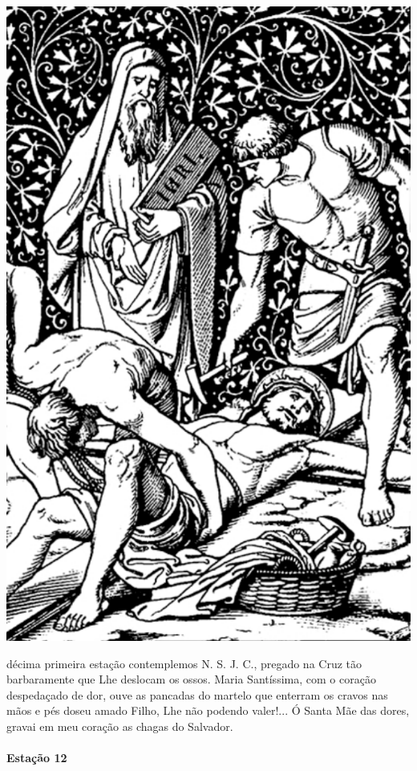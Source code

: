 \begin{nscenter}
\includegraphics[width=.8\textwidth, height=.8\textheight, keepaspectratio]{media/station11}
\end{nscenter}

 décima primeira estação contemplemos N. S. J. C., pregado na Cruz tão barbaramente que Lhe deslocam os ossos. Maria Santíssima, com o coração despedaçado de dor, ouve as pancadas do martelo que enterram os cravos nas mãos e pés doseu amado Filho, Lhe não podendo valer!...
Ó Santa Mãe das dores, gravai em meu coração as chagas do Salvador.

\newpage

\paragraph{Estação 12}

